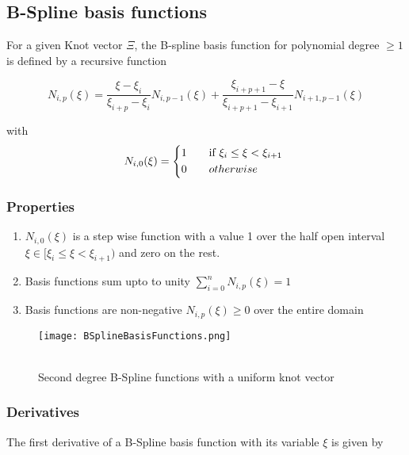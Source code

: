 \documentclass[11pt]{article}
\begin{document}
\subsection{B-Spline basis functions }

For a given Knot vector $\Xi$, the B-spline basis function for polynomial degree
$\geq 1$ is defined by a recursive function

\begin{equation}
N_{i,p}(\xi) = \frac{\xi-\xi_{i}}{\xi_{i+p}-\xi_{i}} N_{i,p-1}(\xi) + 
\frac{\xi_{i+p+1}-\xi}{\xi_{i+p+1}-\xi_{i+1}} N_{i+1,p-1}(\xi)
\end{equation}

\noindent
with
\begin{equation}
N_{i,0}(\xi) = 
\begin{cases*}
1 \quad& if $  \xi_{i} \leq \xi<\xi_{i+1} $ \\
0 &  $ otherwise $ \\
\end{cases*}
\end{equation}

\subsubsection{Properties }
\begin{enumerate}
	\item $ N_{i,0}(\xi)$ is a step wise function with a value 1 over the half open
	interval $ \xi \in [\xi_{i}  \leq \xi<\xi_{i+1}) $ and zero on the rest.
	\item Basis functions sum upto to unity $\sum_{i=0}^{n} N_{i,p}(\xi) =1$
	\item Basis functions are non-negative $ N_{i,p}(\xi) \geq 0$ over the entire
	domain
\end{enumerate}

\begin{figure}[H]
	\begin{center}
		\texttt{[image: BSplineBasisFunctions.png]} 
		\caption{\\Second degree B-Spline functions with a uniform knot vector  }\label{BSplineBasisFunctions}
	\end{center}	
\end{figure}

 

\subsubsection{Derivatives }
The first derivative of a B-Spline basis function with its variable $\xi$ is
given by
\end{document}
